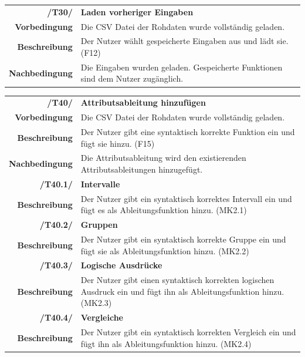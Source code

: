\documentclass{article}
\begin{document}
\begin{table}[H]
\begin{tabularx}{\textwidth}{rX}
\textbf{/T30/}         & \textbf{Laden vorheriger Eingaben} \\
\textbf{Vorbedingung}  & Die CSV Datei der Rohdaten wurde vollständig geladen.   \\
\textbf{Beschreibung}  & Der Nutzer wählt gespeicherte Eingaben aus und lädt sie. (F12) \\
\textbf{Nachbedingung} & Die Eingaben wurden geladen. Gespeicherte Funktionen sind dem Nutzer zugänglich. 
\end{tabularx}
\end{table}

\begin{table}[H]
\begin{tabularx}{\textwidth}{rX}
\textbf{/T40/}         & \textbf{Attributsableitung hinzufügen} \\
\textbf{Vorbedingung}  & Die CSV Datei der Rohdaten wurde vollständig geladen.   \\
\textbf{Beschreibung}  & Der Nutzer gibt eine syntaktisch korrekte Funktion ein und fügt sie hinzu. (F15) \\
\textbf{Nachbedingung} & Die Attributsableitung wird den existierenden Attributsableitungen hinzugefügt.\\

\textbf{/T40.1/}         & \textbf{Intervalle} \\
\textbf{Beschreibung}  & Der Nutzer gibt ein syntaktisch korrektes Intervall ein und fügt es als Ableitungsfunktion hinzu. (MK2.1) \\

\textbf{/T40.2/}         & \textbf{Gruppen} \\
\textbf{Beschreibung}  & Der Nutzer gibt ein syntaktisch korrekte Gruppe ein und fügt sie als Ableitungsfunktion hinzu. (MK2.2) \\

\textbf{/T40.3/}         & \textbf{Logische Ausdrücke} \\
\textbf{Beschreibung}  & Der Nutzer gibt einen syntaktisch korrekten logischen Ausdruck ein und fügt ihn als Ableitungsfunktion hinzu. (MK2.3) \\

\textbf{/T40.4/}         & \textbf{Vergleiche} \\
\textbf{Beschreibung}  & Der Nutzer gibt ein syntaktisch korrekten Vergleich ein und fügt ihn als Ableitungsfunktion hinzu. (MK2.4) \\
\end{tabularx}
\end{table}
\end{document}
